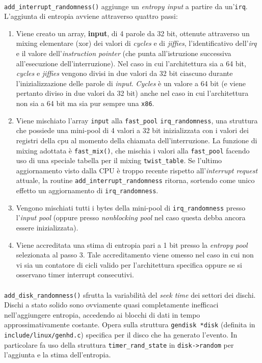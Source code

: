 \documentclass{article}
\begin{document}
 \paragraph{} \verb+add_interrupt_randomness()+ aggiunge un
 \emph{entropy input} a partire da un'\verb+irq+. L'aggiunta di entropia avviene
 attraverso quattro passi:
 \begin{enumerate}
   \item Viene creato un array, \textbf{input}, di 4 parole da 32 bit, ottenute
   attraverso un mixing elementare (xor) dei valori di \emph{cycles} e di \emph{jiffies},
   l'identificativo dell'\emph{irq} e il valore dell'\emph{instruction pointer}
   (che punta all'istruzione successiva all'esecuzione dell'interruzione). Nel
   caso in cui l'architettura sia a 64 bit, \emph{cycles} e
   \emph{jiffies} vengono divisi in due valori da 32 bit ciascuno durante
   l'inizializzazione delle parole di \emph{input}. \emph{Cycles} è un valore a
   64 bit (e viene pertanto diviso in due valori da 32 bit) anche nel caso in
   cui l'architettura non sia a 64 bit ma sia pur sempre una \verb+x86+.
   \item Viene mischiato l'array \verb+input+ alla
   \verb+fast_pool+ \verb+irq_randomness+, una
   struttura che possiede una mini-pool di 4 valori a 32 bit inizializzata con i
   valori dei registri della cpu al momento della chiamata dell'interruzione. 
   La funzione di mixing adottata è \verb+fast_mix()+, che mischia i valori alla
   \verb+fast_pool+ facendo uso di una speciale tabella per il mixing
   \verb+twist_table+. Se l'ultimo aggiornamento visto dalla
   CPU è troppo recente rispetto all'\emph{interrupt request} attuale, la
   routine \verb+add_interrupt_randomness+ ritorna, sortendo come unico effetto
   un aggiornamento di \verb+irq_randomness+.
   \item Vengono mischiati tutti i bytes della mini-pool di
   \verb+irq_randomness+ presso l'\emph{input pool} (oppure
   presso \emph{nonblocking pool} nel caso questa debba ancora essere
   inizializzata).
   \item Viene accreditata una stima di entropia pari a 1 bit presso la
   \emph{entropy pool} selezionata al passo 3. Tale accreditamento viene omesso
   nel caso in cui non vi sia un contatore di cicli valido per l'architettura
   specifica oppure se si osservano timer interrupt consecutivi.
 \end{enumerate} 

 
 \paragraph{} \verb+add_disk_randomness()+ sfrutta la variabilità del 
 \emph{seek time} dei settori dei dischi. Dischi a stato solido sono ovviamente
 quasi completamente inefficaci nell'aggiungere entropia, accedendo ai blocchi di 
 dati in tempo approssimativamente costante. \newline{}Opera sulla struttura 
 \verb+gendisk *disk+ (definita in \verb+include/linux/genhd.c+) specifica per
 il disco che ha generato l'evento.
 In particolare fa uso della struttura \verb+timer_rand_state+ in
 \verb+disk->random+ per l'aggiunta e la stima dell'entropia.
 
\end{document}
